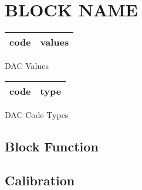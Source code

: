 \chapter{BLOCK NAME}



\begin{marginfigure}
    \small
    \begin{tabular}{c|c}
      code &values\\
      \hline
    \end{tabular}
    \caption{DAC Values \cite{fu.h}}
    \label{block:codes}
\end{marginfigure}
\begin{marginfigure}
    \small
    \begin{tabular}{c|c}
      code & type \\
      \hline
    \end{tabular}
    \caption{DAC Code Types\cite{fu.h}}
    \label{block:codes}
  \end{marginfigure}

  
\section{Block Function}\label{block:blockfun}

\begin{algorithmic}
\end{algorithmic}


\section{Calibration}\label{block:calib}


\begin{algorithmic}
\end{algorithmic}
